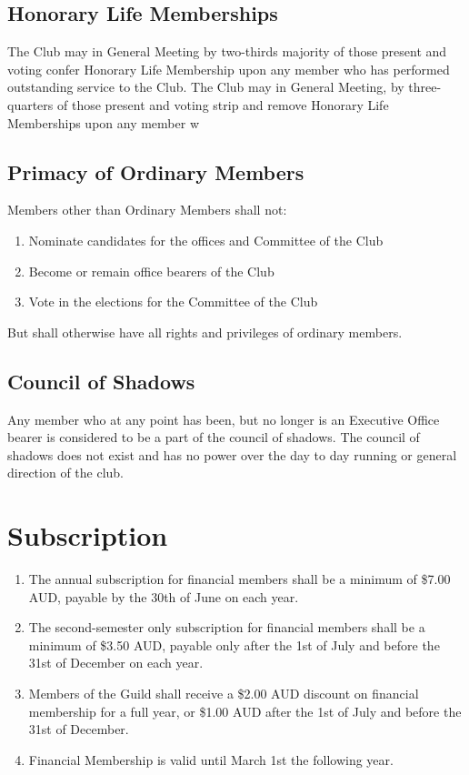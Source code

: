 \documentclass[10pt,a4paper]{report}
\begin{document}
		\subsection{Honorary Life Memberships}
			The Club may in General Meeting by two-thirds majority of those present and voting confer Honorary Life Membership upon any member who has performed outstanding service to the Club.
            The Club may in General Meeting, by three-quarters of those present and voting strip and remove Honorary Life Memberships upon any member w
		\subsection{Primacy of Ordinary Members}
		Members other than Ordinary Members shall not:
		\begin{enumerate}[label=\alph*]
			\item Nominate candidates for the offices and Committee of the Club
			\item Become or remain office bearers of the Club
			\item Vote in the elections for the Committee of the Club
		\end{enumerate}
		But shall otherwise have all rights and privileges of ordinary members.
		\subsection{Council of Shadows}
		Any member who at any point has been, but no longer is an Executive Office bearer is considered to be a part of the council of shadows. The council of shadows does not exist and has no power over the day to day running or general direction of the club.
	\section{Subscription}

		\begin{enumerate}[label=\alph*]
			\item The annual subscription for financial members shall be a minimum of \$7.00 AUD, payable by the 30th of June on each year.

			\item The second-semester only subscription for financial members shall be a minimum of \$3.50 AUD, payable only after the 1st of July and before the 31st of December on each year.

			\item Members of the Guild shall receive a \$2.00 AUD discount on financial membership for a full year, or \$1.00 AUD after the 1st of July and before the 31st of December.

			\item Financial Membership is valid until March 1st the following year.
		\end{enumerate}
\end{document}

